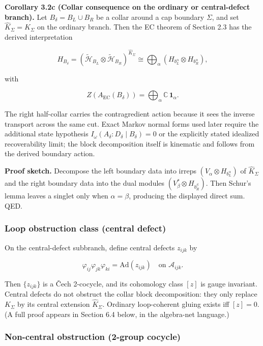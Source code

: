 \textbf{Corollary 3.2c (Collar consequence on the ordinary or central-defect branch).} Let \(B_\delta = B_L \cup B_R\) be a collar around a cap boundary \(\Sigma\), and set \(\widehat K_\Sigma = K_\Sigma\) on the ordinary branch. Then the EC theorem of Section 2.3 has the derived interpretation

\[
H_{B_\delta}
=
(\tilde{\mathcal H}_{B_L}\otimes \tilde{\mathcal H}_{B_R})^{\widehat K_\Sigma}
\cong
\bigoplus_\alpha
(H_{b_L^\alpha}\otimes H_{b_R^\alpha}),
\]

with

\[
Z(A_{\mathrm{EC}}(B_\delta)) = \bigoplus_\alpha \mathbb C\,\mathbf 1_\alpha.
\]

The right half-collar carries the contragredient action because it sees the inverse transport across the same cut. Exact Markov normal forms used later require the additional state hypothesis \(I_\omega(A_\delta:D_\delta \mid B_\delta)=0\) or the explicitly stated idealized recoverability limit; the block decomposition itself is kinematic and follows from the derived boundary action.

\textbf{Proof sketch.} Decompose the left boundary data into irreps \((V_\alpha \otimes H_{b_L^\alpha})\) of \(\widehat K_\Sigma\) and the right boundary data into the dual modules \((V_\beta^* \otimes H_{b_R^\beta})\). Then Schur's lemma leaves a singlet only when \(\alpha=\beta\), producing the displayed direct sum. QED.

\subsubsection{Loop obstruction class (central defect)}\label{33-loop-obstruction-class-central-defect}

On the central-defect subbranch, define central defects \(z_{ijk}\) by

\[
\varphi_{ij} \varphi_{jk} \varphi_{ki} = \mathrm{Ad}(z_{ijk}) \quad \text{on } \mathcal{A}_{ijk}.
\]

Then \(\{z_{ijk}\}\) is a \v{C}ech 2-cocycle, and its cohomology class \([z]\) is gauge invariant. Central defects do not obstruct the collar block decomposition: they only replace \(K_\Sigma\) by its central extension \(\widehat K_\Sigma\). Ordinary loop-coherent gluing exists iff \([z] = 0\). (A full proof appears in Section 6.4 below, in the algebra-net language.)

\subsubsection{Non-central obstruction (2-group cocycle)}\label{34-non-central-obstruction-2-group-cocycle}

